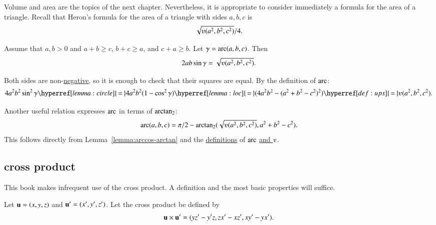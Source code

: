 %
Volume and area are the topics of the next chapter.  Nevertheless, it
is appropriate to consider immediately a formula for the area of a
triangle.  Recall that Heron's formula for the area of a triangle with
sides $a,b,c$
is \begin{displaymath}\sqrt{\ups(a^2,b^2,c^2)}/4.\end{displaymath}

\begin{lemma}\label{lemma:los}
Assume that $a,b>0$ and $a+b\ge c$, $b+c\ge a$, and $c+a\ge b$.
Let $\gamma=\operatorname{arc}(a,b,c)$.  Then
\begin{displaymath}2 a b \sin\gamma =
  \sqrt{\ups(a^2,b^2,c^2)}.\end{displaymath}
\end{lemma}
%
%
%
\begin{proved}
  Both sides are non-\hyperref[lemma:sin-pos]{negative}, so it is
  enough to check that their squares are equal.  By the definition of
  $\operatorname{arc}$:
\begin{displaymath}
4 a^2 b^2 \sin^2\gamma 
\hyperref[lemma:circle]{\,=\,} 4 a^2 b^2 (1-\cos^2\gamma) 
\hyperref[lemma:loc]{\,=\,} (4 a^2 b^2 - (a^2 + b^2 -
c^2)^2) 
\hyperref[def:ups]{\,=\,} \ups(a^2,b^2,c^2).\end{displaymath}
\swallowed\end{proved}

Another useful relation expresses $\operatorname{arc}$ in terms of ${\operatorname{arctan_2}}$:
\begin{equation}\label{eqn:arc-atn}
\arc(a,b,c) = 
\pi/2 - \atn({\sqrt{\ups(a^2,b^2,c^2)}},{ a^2 + b^2 - c^2}).
\end{equation}
This follows directly from Lemma~\ref{lemma:arccos-arctan} and the
\hyperref[def:arc]{definitions} of $\operatorname{arc}$ \hyperref[def:ups]{and
  $\ups$}.



\subsection{cross product} 

This book makes infrequent use of the cross product.
A definition and the most basic properties will suffice.

\begin{definition}\label{def:cross}
Let ${\mathbf u} =(x,y,z)$ and ${\mathbf u}' = (x',y',z')$.  
Let the cross product be defined
by
\begin{displaymath}
{\mathbf u} \times {\mathbf u}' = (y z' - y' z, z x' - x z', x y' - y x').
\end{displaymath}
%
%
%
\end{definition}

